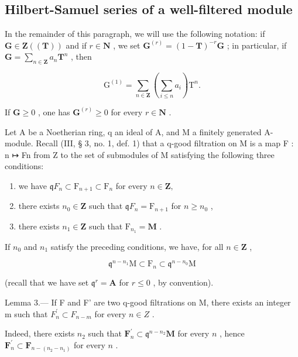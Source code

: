 \subsection{Hilbert-Samuel series of a well-filtered module}

In the remainder of this paragraph, we will use the following notation: if \(\mathbf{G} \in \mathbf{Z}((\mathbf{T}))\) and if \(r \in \mathbf{N}\) , we set \(\mathbf{G}^{(r)} = (1 - \mathbf{T})^{-r}\mathbf{G}\) ; in particular, if \(\mathbf{G} = \sum_{n \in \mathbf{Z}} a_n \mathbf{T}^n\) , then

\[
\mathrm{G} ^ {(1)} = \sum_ {n \in \mathbf {Z}} \left(\sum_ {i \leqslant n} a _ {i}\right) \mathrm{T} ^ {n}.
\]

If \(\mathbf{G} \geqslant 0\) , one has \(\mathbf{G}^{(r)} \geqslant 0\) for every \(r \in \mathbf{N}\) .

Let A be a Noetherian ring, q an ideal of A, and M a finitely generated A-module. Recall (III, § 3, no. 1, def. 1) that a q-good filtration on M is a map F : n ↦ Fn from Z to the set of submodules of M satisfying the following three conditions:

\begin{enumerate}
\def\labelenumi{\alph{enumi})}
\item
  we have \(\mathfrak{q}F_n\subset \mathrm{F}_{n + 1}\subset \mathrm{F}_n\) for every \(n\in \mathbf{Z},\)
\item
  there exists \(n_0 \in \mathbf{Z}\) such that \(\mathfrak{q}F_n = \mathrm{F}_{n+1}\) for \(n \geqslant n_0\) ,
\item
  there exists \(n_{1} \in \mathbf{Z}\) such that \(\mathrm{F}_{n_1} = \mathbf{M}\) .
\end{enumerate}

If \(n_{0}\) and \(n_{1}\) satisfy the preceding conditions, we have, for all \(n\in\mathbf{Z}\) ,

\[
\mathfrak {q} ^ {n - n _ {1}} \mathrm{M} \subset \mathrm{F} _ {n} \subset \mathfrak {q} ^ {n - n _ {0}} \mathrm{M}\tag{7}
\]

(recall that we have set \(\mathfrak{q}^r = \mathbf{A}\) for \(r\leqslant 0\) , by convention).

Lemma 3.--- If F and F' are two q-good filtrations on M, there exists an integer m such that \(F_{n}^{\prime} \subset F_{n-m}\) for every \(n \in Z\) .

Indeed, there exists \(n_{2}\) such that \(\mathbf{F}_{n}^{\prime}\subset\mathfrak{q}^{n-n_{2}}\mathbf{M}\) for every \(n\) , hence \(\mathbf{F}_{n}^{\prime}\subset\mathbf{F}_{n-(n_{2}-n_{1})}\) for every \(n\) .

